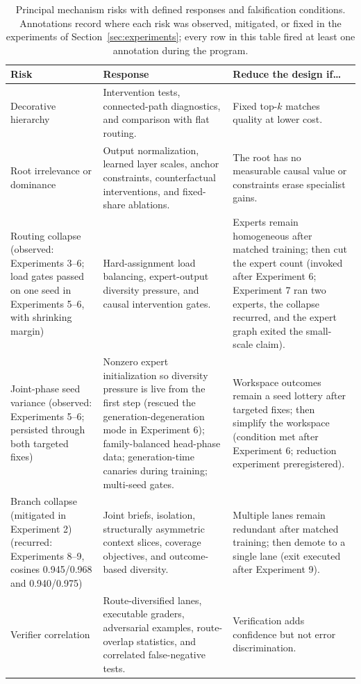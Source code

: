 \documentclass[10pt,a4paper]{article}
\newcommand{\fail}[1]{\textcolor{failred}{#1}}
\newcommand{\good}[1]{\textcolor{okgreen}{#1}}
\begin{document}
\begin{table}[htbp]
\caption{Principal mechanism risks with defined responses and falsification
conditions. Annotations record where each risk was observed, mitigated, or
fixed in the experiments of Section~\ref{sec:experiments}; every row in this
table fired at least one annotation during the program.}
\label{tab:failuremodes}
\centering\footnotesize
\begin{tabularx}{\textwidth}{@{}>{\raggedright\arraybackslash}p{}XX@{}}
\toprule
\textbf{Risk} & \textbf{Response} & \textbf{Reduce the design if\ldots} \\
\midrule
Decorative hierarchy & Intervention tests, connected-path diagnostics, and comparison with flat routing. & Fixed top-$k$ matches quality at lower cost. \\
Root irrelevance or dominance & Output normalization, learned layer scales, anchor constraints, counterfactual interventions, and fixed-share ablations. & The root has no measurable causal value or constraints erase specialist gains. \\
Routing collapse \fail{(observed: Experiments 3--6; load gates passed on one seed in Experiments 5--6, with shrinking margin)} & Hard-assignment load balancing, expert-output diversity pressure, and causal intervention gates. & Experts remain homogeneous after matched training; then cut the expert count \fail{(invoked after Experiment 6; Experiment 7 ran two experts, the collapse recurred, and the expert graph exited the small-scale claim)}. \\
Joint-phase seed variance \fail{(observed: Experiments 5--6; persisted through both targeted fixes)} & Nonzero expert initialization so diversity pressure is live from the first step \good{(rescued the generation-degeneration mode in Experiment 6)}; family-balanced head-phase data; generation-time canaries during training; multi-seed gates. & Workspace outcomes remain a seed lottery after targeted fixes; then simplify the workspace \fail{(condition met after Experiment 6; reduction experiment preregistered)}. \\
Branch collapse \good{(mitigated in Experiment 2)} \fail{(recurred: Experiments 8--9, cosines 0.945/0.968 and 0.940/0.975)} & Joint briefs, isolation, structurally asymmetric context slices, coverage objectives, and outcome-based diversity. & Multiple lanes remain redundant after matched training; then demote to a single lane \fail{(exit executed after Experiment 9)}. \\
Verifier correlation & Route-diversified lanes, executable graders, adversarial examples, route-overlap statistics, and correlated false-negative tests. & Verification adds confidence but not error discrimination. \\

\end{tabularx}
\end{table}
\end{document}
